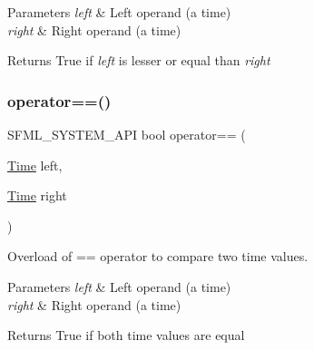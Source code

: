 \begin{DoxyParams}{Parameters}
{\em left} & Left operand (a time) \\
\hline
{\em right} & Right operand (a time)\\
\hline
\end{DoxyParams}
\begin{DoxyReturn}{Returns}
True if {\itshape left} is lesser or equal than {\itshape right} \begin{DoxyVerb}\end{DoxyVerb}
 
\end{DoxyReturn}
\mbox{\label{classsf_1_1_time_a2b8453227f651e9d5db3663fa08c47e2}} 
\subsubsection{\texorpdfstring{operator==()}{operator==()}}
{\footnotesize\ttfamily S\+F\+M\+L\+\_\+\+S\+Y\+S\+T\+E\+M\+\_\+\+A\+PI bool operator== (\begin{DoxyParamCaption}\item[{\mbox{\hyperlink{classsf_1_1_time}{Time}}}]{left,  }\item[{\mbox{\hyperlink{classsf_1_1_time}{Time}}}]{right }\end{DoxyParamCaption})\hspace{0.3cm}{\ttfamily [related]}}



Overload of == operator to compare two time values. 


\begin{DoxyParams}{Parameters}
{\em left} & Left operand (a time) \\
\hline
{\em right} & Right operand (a time)\\
\hline
\end{DoxyParams}
\begin{DoxyReturn}{Returns}
True if both time values are equal \begin{DoxyVerb}\end{DoxyVerb}
 
\end{DoxyReturn}
\mbox{\label{classsf_1_1_time_a23978402846bf3c7ac54a3f2c6b397a2}} 
